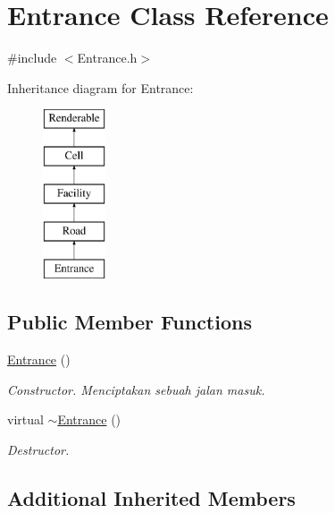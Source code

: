 \hypertarget{classEntrance}{\section{Entrance Class Reference}
\label{classEntrance}
}


{\ttfamily \#include $<$Entrance.\+h$>$}

Inheritance diagram for Entrance\+:\begin{figure}[H]
\begin{center}
\leavevmode
\includegraphics[height=5.000000cm]{classEntrance}
\end{center}
\end{figure}
\subsection*{Public Member Functions}
\begin{DoxyCompactItemize}
\item 
\hypertarget{classEntrance_a88cd27875093371afa47ac0f321716d7}{\hyperlink{classEntrance_a88cd27875093371afa47ac0f321716d7}{Entrance} ()}\label{classEntrance_a88cd27875093371afa47ac0f321716d7}

\begin{DoxyCompactList}\small\item\em Constructor. Menciptakan sebuah jalan masuk. \end{DoxyCompactList}\item 
\hypertarget{classEntrance_a05919fe3f4948ea3266b5dd4c5e119ac}{virtual \hyperlink{classEntrance_a05919fe3f4948ea3266b5dd4c5e119ac}{$\sim$\+Entrance} ()}\label{classEntrance_a05919fe3f4948ea3266b5dd4c5e119ac}

\begin{DoxyCompactList}\small\item\em Destructor. \end{DoxyCompactList}\end{DoxyCompactItemize}
\subsection*{Additional Inherited Members}


